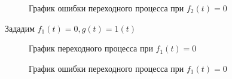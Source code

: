 \documentclass[a4paper, 11pt]{article}
\begin{document}
\newpage

\begin{figure}[h!]
    \caption{График ошибки переходного процесса при $f_2(t) = 0$}
    \label{tree}
\end{figure}

Зададим $f_1(t) = 0, g(t) = 1(t)$

\begin{figure}[h!]
    \caption{График переходного процесса при $f_1(t) = 0$}
    \label{two}
\end{figure}
    
\newpage    
    
\begin{figure}[h!]
    \caption{График ошибки переходного процесса при $f_1(t) = 0$}
    \label{tree}
\end{figure}
\end{document}
